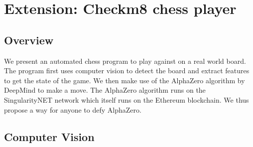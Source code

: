\documentclass[11pt]{article}
\begin{document}
\section{Extension: Checkm8 chess player}

\subsection{Overview}

We present an automated chess program to play against on a real world board. The
program first uses computer vision to detect the board and extract features to
get the state of the game. We then make use of the AlphaZero algorithm by
DeepMind to make a move. The AlphaZero algorithm runs on the SingularityNET
network which itself runs on the Ethereum blockchain. We thus propose a way for
anyone to defy AlphaZero.

\subsection{Computer Vision}
\end{document}
